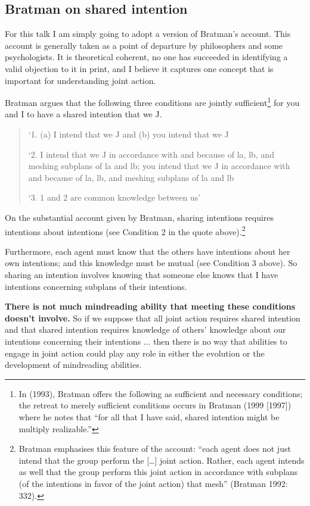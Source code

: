 \documentclass[12pt,a4paper]{extarticle}
\begin{document}
\subsection{Bratman on shared intention}
For this talk I am simply going to adopt a version of Bratman's account.
This account is generally taken as a point of departure by philosophers and some psychologists.
It is theoretical coherent, 
no one has succeeded in identifying a valid objection to it in print, 
and I believe it captures one concept that is important for understanding joint action.

Bratman argues that the following three conditions are jointly sufficient\footnote{
In (1993), Bratman offers the following as sufficient and necessary conditions; the retreat to merely sufficient conditions occurs in Bratman (1999 [1997]) where he notes that “for all that I have said, shared intention might be multiply realizable.”
}  
for you and I to have a shared intention that we J. 
%
\begin{quote}
`1. (a) I intend that we J and (b) you intend that we J

`2. I intend that we J in accordance with and because of la, lb, and meshing subplans of la and lb; you intend that we J in accordance with and because of la, lb, and meshing subplans of la and lb

`3. 1 and 2 are common knowledge between us' \citep[View 4]{Bratman:1993je}
\end{quote}
%
On the substantial account given by Bratman, sharing intentions requires intentions about intentions (see Condition 2 in the quote above).\footnote{
Bratman emphasises this feature of the account: “each agent does not just intend that the group perform the […] joint action. Rather, each agent intends as well that the group perform this joint action in accordance with subplans (of the intentions in favor of the joint action) that mesh” (Bratman 1992: 332).
}

Furthermore, each agent must know that the others have intentions about her own intentions; and this knowledge must be mutual (see Condition 3 above).  So sharing an intention involves knowing that someone else knows that I have intentions concerning subplans of their intentions.  

\textbf{There is not much mindreading ability that meeting these conditions doesn't involve.}  
So if we suppose that all joint action requires shared intention and that shared intention requires knowledge of others' knowledge about our intentions concerning their intentions ... then there is no way that abilities to engage in joint action could play any role in either the evolution or the development of mindreading abilities.
\end{document}
